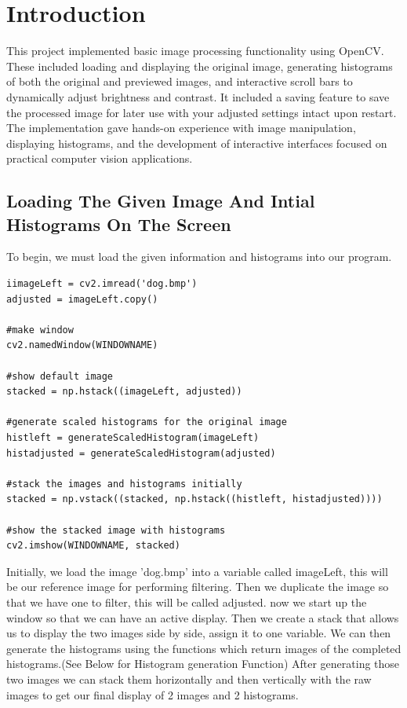 \chapter{Introduction}
\label{ch:intro}
This project implemented basic image processing functionality using OpenCV. These included loading and displaying the original image, generating histograms of both the original and previewed images, and interactive scroll bars to dynamically adjust brightness and contrast. It included a saving feature to save the processed image for later use with your adjusted settings intact upon restart. The implementation gave hands-on experience with image manipulation, displaying histograms, and the development of interactive interfaces focused on practical computer vision applications.

\section{Loading The Given Image And Intial Histograms On The Screen}
To begin, we must load the given information and histograms into our program.
\begin{verbatim}
iimageLeft = cv2.imread('dog.bmp')
adjusted = imageLeft.copy()

#make window
cv2.namedWindow(WINDOWNAME)

#show default image
stacked = np.hstack((imageLeft, adjusted))

#generate scaled histograms for the original image
histleft = generateScaledHistogram(imageLeft)
histadjusted = generateScaledHistogram(adjusted)

#stack the images and histograms initially
stacked = np.vstack((stacked, np.hstack((histleft, histadjusted))))

#show the stacked image with histograms
cv2.imshow(WINDOWNAME, stacked)
\end{verbatim}
Initially, we load the image 'dog.bmp' into a variable called imageLeft, this will be our reference image for performing filtering. Then we duplicate the image so that we have one to filter, this will be called adjusted. now we start up the window so that we can have an active display. Then we create a stack that allows us to display the two images side by side, assign it to one variable. We can then generate the histograms using the functions which return images of the completed histograms.(See Below for Histogram generation Function) After generating those two images we can stack them horizontally and then vertically with the raw images to get our final display of 2 images and 2 histograms.

